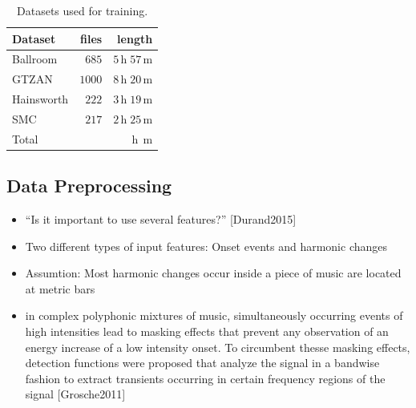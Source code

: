 \documentclass{scrartcl}
\begin{document}
\begin{table}[htbp]
    \caption{Datasets used for training.}
    \label{tab:datasets}
    \centering

    \begin{tabular}{lrr}
    \hline

    \hline
    \textbf{Dataset} & \textbf{files} & \textbf{length} \\
    \hline
        Ballroom \cite{Gouyon2006b, Krebs2013} & $685$ & $5\,\text{h} \;57\,\text{m}$\\
        GTZAN \cite{Tzanetakis2002b, marchand2015swing} & $1000$ & $8\,\text{h}\;20\,\text{m}$\\
        Hainsworth \cite{Hainsworth2004} & $222$ & $3\,\text{h}\;19\,\text{m}$\\
        SMC \cite{Holzapfel2012} & $217$ & $2\,\text{h}\;25\,\text{m}$\\    
    \hline
        Total & $ $ & $ \,\text{h}\; \,\text{m}$\\  
    \hline

    \hline
    \end{tabular}
\end{table}  


\subsection{Data Preprocessing}

\begin{itemize}
\item ``Is it important to use several features?'' [Durand2015]
\end{itemize}


\begin{itemize}
\item Two different types of input features: Onset events and harmonic changes
\item Assumtion: Most harmonic changes occur inside a piece of music are located at metric bars \cite[Khadkevich2012]{Khadkevich2012}
\item in complex polyphonic mixtures of music, simultaneously occurring events of high intensities lead to masking effects that prevent any observation of an energy increase of a low intensity onset. To circumbent thesse masking effects, detection functions were proposed that analyze the signal in a bandwise fashion to extract transients occurring in certain frequency regions of the signal [Grosche2011]
\end{itemize}
\end{document}
